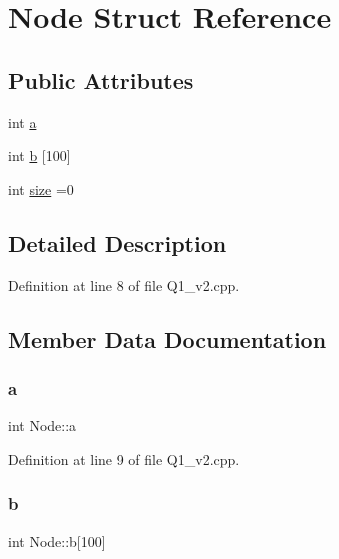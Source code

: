 \hypertarget{struct_node}{}\section{Node Struct Reference}
\label{struct_node}
\subsection*{Public Attributes}
\begin{DoxyCompactItemize}
\item 
int \hyperlink{struct_node_a2fdf3febffa37539c09d0a282525033a}{a}
\item 
int \hyperlink{struct_node_a26cb9e26541900f36489bf503338ce4e}{b} \mbox{[}100\mbox{]}
\item 
int \hyperlink{struct_node_acc103d220defd2fdb5aac8e3b03424c6}{size} =0
\end{DoxyCompactItemize}


\subsection{Detailed Description}


Definition at line 8 of file Q1\+\_\+v2.\+cpp.



\subsection{Member Data Documentation}
\mbox{\label{struct_node_a2fdf3febffa37539c09d0a282525033a}} 
\subsubsection{\texorpdfstring{a}{a}}
{\footnotesize\ttfamily int Node\+::a}



Definition at line 9 of file Q1\+\_\+v2.\+cpp.

\mbox{\label{struct_node_a26cb9e26541900f36489bf503338ce4e}} 
\subsubsection{\texorpdfstring{b}{b}}
{\footnotesize\ttfamily int Node\+::b\mbox{[}100\mbox{]}}



